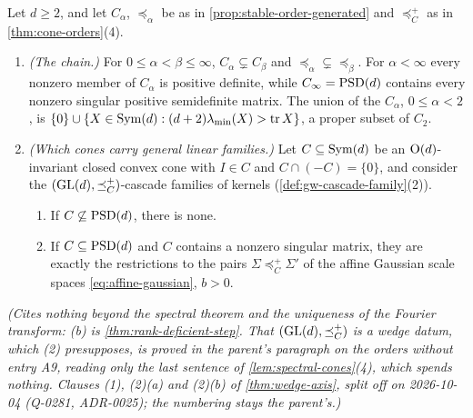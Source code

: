 \begin{lemma}
\label{lem:wedge-axis-chain}
\leanok
Let $d \ge 2$, and let $C_\alpha$, $\preceq_\alpha$ be as in \ref{prop:stable-order-generated} and
$\preceq^+_C$ as in \ref{thm:cone-orders}(4).
\begin{enumerate}
\item[(1)] \emph{(The chain.)} For $0 \le \alpha < \beta \le \infty$, $C_\alpha \subsetneq C_\beta$ and
$\preceq_\alpha \subsetneq \preceq_\beta$. For $\alpha < \infty$ every nonzero member of $C_\alpha$ is positive
definite, while $C_\infty = \mathrm{PSD}(d)$ contains every nonzero singular positive semidefinite matrix. The union of
the $C_\alpha$, $0 \le \alpha < 2$, is $\{0\} \cup \{X \in \mathrm{Sym}(d) : (d+2)\lambda_{\min}(X) > \operatorname{tr} X\}$, a proper
subset of $C_2$.
\item[(2)] \emph{(Which cones carry general linear families.)} Let $C \subseteq \mathrm{Sym}(d)$ be an $\mathrm{O}(d)$-invariant
closed convex cone with $I \in C$ and $C \cap (-C) = \{0\}$, and consider the
$(\mathrm{GL}(d), \preceq^+_C)$-cascade families of kernels (\ref{def:gw-cascade-family}(2)).
\begin{enumerate}
\item[(a)] If $C \not\subseteq \mathrm{PSD}(d)$, there is none.
\item[(b)] If $C \subseteq \mathrm{PSD}(d)$ and $C$ contains a nonzero singular matrix, they are exactly the
restrictions to the pairs $\Sigma \preceq^+_C \Sigma'$ of the affine Gaussian scale spaces
\ref{eq:affine-gaussian}, $b > 0$.
\end{enumerate}
\end{enumerate}
\statusT\quad\emph{(Cites nothing beyond the spectral theorem and the uniqueness of the Fourier
transform: (b) is \ref{thm:rank-deficient-step}. That $(\mathrm{GL}(d), \preceq^+_C)$ is a wedge datum, which (2)
presupposes, is proved in the parent's paragraph on the orders without entry A9, reading only the last
sentence of \ref{lem:spectral-cones}(4), which spends nothing. Clauses (1), (2)(a) and (2)(b) of
\ref{thm:wedge-axis}, split off on 2026-10-04 (Q-0281, ADR-0025); the numbering stays the parent's.)}
\end{lemma}

